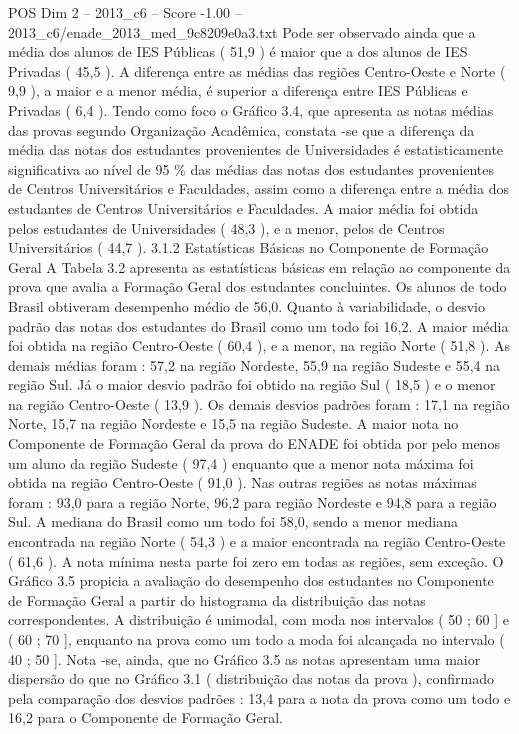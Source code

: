 \begin{textsample}{POS Dim 2 – 2013\_c6 – Score -1.00 – 2013\_c6/enade\_2013\_med\_9c8209e0a3.txt}
Pode ser observado ainda que a média dos alunos de IES Públicas ( 51,9 ) é maior que a dos alunos de IES Privadas ( 45,5 ).
A diferença entre as médias das regiões Centro-Oeste e Norte ( 9,9 ), a maior e a menor média, é superior a diferença entre IES Públicas e Privadas ( 6,4 ).
Tendo como foco o Gráfico 3.4, que apresenta as notas médias das provas segundo Organização Acadêmica, constata -se que a diferença da média das notas dos estudantes provenientes de Universidades é estatisticamente significativa ao nível de 95 \% das médias das notas dos estudantes provenientes de Centros Universitários e Faculdades, assim como a diferença entre a média dos estudantes de Centros Universitários e Faculdades.
A maior média foi obtida pelos estudantes de Universidades ( 48,3 ), e a menor, pelos de Centros Universitários ( 44,7 ). 3.1.2 Estatísticas Básicas no Componente de Formação Geral A Tabela 3.2 apresenta as estatísticas básicas em relação ao componente da prova que avalia a Formação Geral dos estudantes concluintes.
Os alunos de todo Brasil obtiveram desempenho médio de 56,0.
Quanto à variabilidade, o desvio padrão das notas dos estudantes do Brasil como um todo foi 16,2.
A maior média foi obtida na região Centro-Oeste ( 60,4 ), e a menor, na região Norte ( 51,8 ).
As demais médias foram : 57,2 na região Nordeste, 55,9 na região Sudeste e 55,4 na região Sul.
Já o maior desvio padrão foi obtido na região Sul ( 18,5 ) e o menor na região Centro-Oeste ( 13,9 ).
Os demais desvios padrões foram : 17,1 na região Norte, 15,7 na região Nordeste e 15,5 na região Sudeste.
A maior nota no Componente de Formação Geral da prova do ENADE foi obtida por pelo menos um aluno da região Sudeste ( 97,4 ) enquanto que a menor nota máxima foi obtida na região Centro-Oeste ( 91,0 ).
Nas outras regiões as notas máximas foram : 93,0 para a região Norte, 96,2 para região Nordeste e 94,8 para a região Sul.
A mediana do Brasil como um todo foi 58,0, sendo a menor mediana encontrada na região Norte ( 54,3 ) e a maior encontrada na região Centro-Oeste ( 61,6 ).
A nota mínima nesta parte foi zero em todas as regiões, sem exceção.
O Gráfico 3.5 propicia a avaliação do desempenho dos estudantes no Componente de Formação Geral a partir do histograma da distribuição das notas correspondentes.
A distribuição é unimodal, com moda nos intervalos ( 50 ; 60 ] e ( 60 ; 70 ], enquanto na prova como um todo a moda foi alcançada no intervalo ( 40 ; 50 ].
Nota -se, ainda, que no Gráfico 3.5 as notas apresentam uma maior dispersão do que no Gráfico 3.1 ( distribuição das notas da prova ), confirmado pela comparação dos desvios padrões : 13,4 para a nota da prova como um todo e 16,2 para o Componente de Formação Geral.

\end{textsample}
